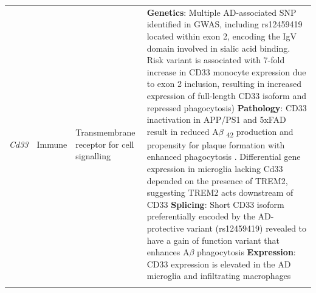 \begin{changemargin}{1.5cm}
\begin{landscape}
\begin{longtable}[c]{p{1cm}p{2cm}p{4cm}p{19cm}}
			\centering \textit{Cd33} &
			\centering Immune  &
			\centering Transmembrane receptor for cell signalling &
			\tabitem \textbf{Genetics}: Multiple AD-associated SNP identified in GWAS, including  rs12459419\cite{Naj2011,Hollingworth2011,Bertram2008} located within exon 2, encoding the IgV domain involved in sialic acid binding\cite{Malik2013}. Risk variant is associated with 7-fold increase in CD33 monocyte expression due to exon 2 inclusion, resulting in increased expression of full-length CD33 isoform and repressed phagocytosis)\cite{Raj2014} 
			\tabitem \textbf{Pathology}: CD33 inactivation in APP/PS1 and 5xFAD result in reduced A$\beta$ \textsubscript{42} production and propensity for plaque formation with enhanced phagocytosis \cite{Griciuc2013}. Differential gene expression in microglia lacking Cd33 depended on the presence of TREM2, suggesting TREM2 acts downstream of CD33\cite{Griciuc2019} 			
			\tabitem \textbf{Splicing}: Short CD33 isoform preferentially encoded by the AD-protective variant (rs12459419) revealed to have a gain of function variant that enhances A$\beta$ phagocytosis \cite{Bhattacherjee2021}\newline		
			\tabitem \textbf{Expression}: CD33 expression is elevated in the AD microglia and infiltrating macrophages\cite{Griciuc2013} \\
			\hdashline[0.5pt/5pt]	
			

\end{longtable}
\end{landscape}
\end{changemargin}
